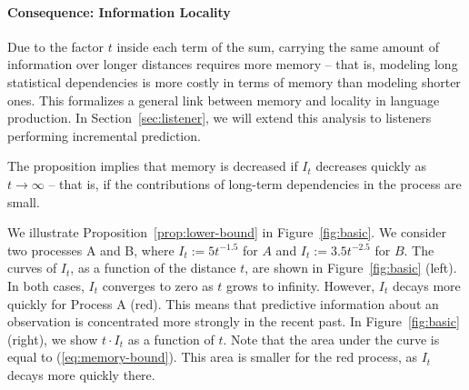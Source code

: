 










\paragraph{Consequence: Information Locality} %

Due to the factor $t$ inside each term of the sum, carrying the same amount of information over longer distances requires more memory -- that is, modeling long statistical dependencies is more costly in terms of memory than modeling shorter ones.
This formalizes a general link between memory and locality in language production.
In Section~\ref{sec:listener}, we will extend this analysis to listeners performing incremental prediction.

The proposition implies that memory is decreased if $I_t$ decreases quickly as $t \rightarrow \infty$ -- that is, if the contributions of long-term dependencies in the process are small.

We illustrate Proposition~\ref{prop:lower-bound} in Figure~\ref{fig:basic}.
We consider two processes A and B, where $I_t := 5t^{-1.5}$ for $A$ and $I_t := 3.5 t^{-2.5}$ for $B$.
The curves of $I_t$, as a function of the distance $t$, are shown in Figure~\ref{fig:basic} (left).
In both cases, $I_t$ converges to zero as $t$ grows to infinity. 
However, $I_t$ decays more quickly for Process A (red).
This means that predictive information about an observation is concentrated more strongly in the recent past.
In Figure~\ref{fig:basic} (right), we show $t\cdot I_t$ as a function of $t$.
Note that the area under the curve is equal to (\ref{eq:memory-bound}).
This area is smaller for the red process, as $I_t$ decays more quickly there.  



